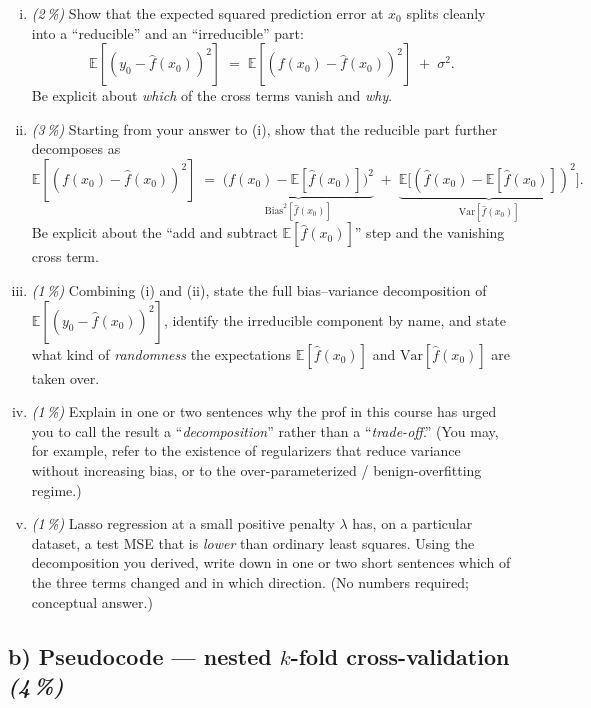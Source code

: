 \documentclass[11pt,a4paper]{article}
\newcommand{\subpoints}[1]{\textit{(#1\,\%)}}
\begin{document}
\begin{enumerate}[(i)]
  \item \subpoints{2} Show that the expected squared prediction error at $x_0$ splits cleanly into a ``reducible'' and an ``irreducible'' part:
  $$\mathbb{E}\!\left[(y_0 - \hat f(x_0))^2\right] \;=\; \mathbb{E}\!\left[(f(x_0) - \hat f(x_0))^2\right] \;+\; \sigma^2.$$
  Be explicit about \emph{which} of the cross terms vanish and \emph{why}.

  \item \subpoints{3} Starting from your answer to (i), show that the reducible part further decomposes as
  $$\mathbb{E}\!\left[(f(x_0) - \hat f(x_0))^2\right] \;=\; \underbrace{\big(f(x_0) - \mathbb{E}[\hat f(x_0)]\big)^2}_{\mathrm{Bias}^2[\hat f(x_0)]} \;+\; \underbrace{\mathbb{E}\!\big[(\hat f(x_0) - \mathbb{E}[\hat f(x_0)])^2\big]}_{\mathrm{Var}[\hat f(x_0)]}.$$
  Be explicit about the ``add and subtract $\mathbb{E}[\hat f(x_0)]$'' step and the vanishing cross term.

  \item \subpoints{1} Combining (i) and (ii), state the full bias--variance decomposition of $\mathbb{E}[(y_0 - \hat f(x_0))^2]$, identify the irreducible component by name, and state what kind of \emph{randomness} the expectations $\mathbb{E}[\hat f(x_0)]$ and $\mathrm{Var}[\hat f(x_0)]$ are taken over.

  \item \subpoints{1} Explain in one or two sentences why the prof in this course has urged you to call the result a ``\emph{decomposition}'' rather than a ``\emph{trade-off}.'' (You may, for example, refer to the existence of regularizers that reduce variance without increasing bias, or to the over-parameterized / benign-overfitting regime.)

  \item \subpoints{1} Lasso regression at a small positive penalty $\lambda$ has, on a particular dataset, a test MSE that is \emph{lower} than ordinary least squares. Using the decomposition you derived, write down in one or two short sentences which of the three terms changed and in which direction. (No numbers required; conceptual answer.)
\end{enumerate}

\subsection*{b) Pseudocode --- nested $k$-fold cross-validation \subpoints{4}}
\end{document}
